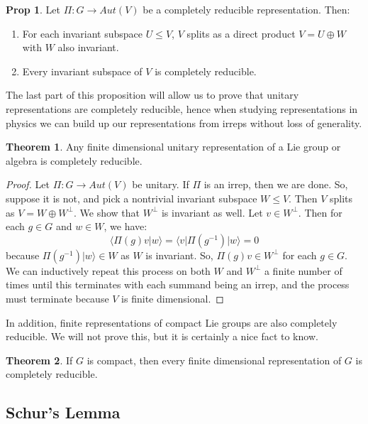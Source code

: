 \documentclass[11pt, oneside]{article}   	%
\theoremstyle{definition}
\newtheorem{theorem}{Theorem}[section]
\newtheorem{prop}{Prop}[section]
\begin{document}
\begin{prop}
	Let $\Pi : G\rightarrow Aut(V)$ be a completely reducible representation. Then:
	\begin{enumerate}
		\item For each invariant subspace $U\leq V$, $V$ splits as a direct product $V = U\oplus W$ with 
		$W$ also invariant. 
		\item Every invariant subspace of $V$ is completely reducible.
	\end{enumerate}
\end{prop}

The last part of this proposition will allow us to prove that unitary representations are completely reducible, hence 
when studying representations in physics we can build up our representations from irreps without loss of generality.

\begin{theorem}
	Any finite dimensional unitary representation of a Lie group or algebra is completely reducible.
\end{theorem}

\begin{proof}
	Let $\Pi : G\rightarrow Aut(V)$ be unitary. If $\Pi$ is an irrep, then we are done. So, suppose it is not, and pick 
	a nontrivial invariant subspace $W\leq V$. Then $V$ splits as $V = W\oplus W^\perp$. We show that $W^\perp$ 
	is invariant as well. Let $v\in W^\perp$. Then for each $g\in G$ and $w\in W$, we have:
	\begin{equation}
		\langle \Pi(g)v|w\rangle = \langle v | \Pi(g^{-1}) |w\rangle = 0
	\end{equation}
	because $\Pi(g^{-1})|w\rangle\in W$ as $W$ is invariant. So, $\Pi(g)v\in W^\perp$ for each $g\in G$. We 
	can inductively repeat this process on both $W$ and $W^\perp$ a finite number of times until this terminates 
	with each summand being an irrep, and the process must terminate because $V$ is finite dimensional. 
\end{proof}

In addition, finite representations of compact Lie groups are also completely reducible. We will not prove this, but it 
is certainly a nice fact to know.

\begin{theorem}
	If $G$ is compact, then every finite dimensional representation of $G$ is completely reducible.
\end{theorem}

\subsection{Schur's Lemma}
\end{document}
